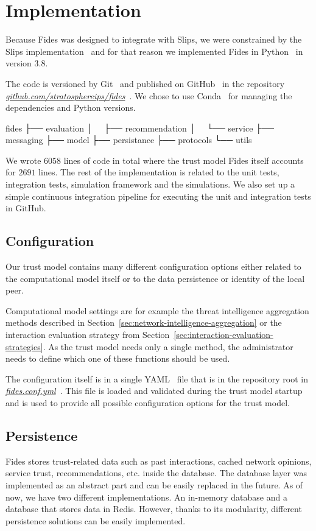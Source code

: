 \section{Implementation}
\label{sec:implementation}
Because Fides was designed to integrate with Slips, we were constrained by the Slips implementation~\cite{slips} and for that reason we implemented Fides in Python~\cite{python} in version 3.8.

The code is versioned by Git~\cite{git} and published on GitHub~\cite{github} in the repository \textit{\href{https://github.com/stratosphereips/fides}{github.com/stratosphereips/fides}}~\cite{fidesGithub}.
We chose to use Conda~\cite{conda} for managing the dependencies and Python versions.

fides
├── evaluation
│   ├── recommendation
│   └── service
├── messaging
├── model
├── persistance
├── protocols
└── utils

We wrote $6058$ lines of code in total where the trust model Fides itself accounts for $2691$ lines. The rest of the implementation is related to the unit tests, integration tests, simulation framework and the simulations.
We also set up a simple continuous integration pipeline for executing the unit and integration tests in GitHub.

\subsection{Configuration}
\label{subsec:configuration}
Our trust model contains many different configuration options either related to the computational model itself or to the data persistence or identity of the local peer.

Computational model settings are for example the threat intelligence aggregation methods described in Section~\ref{sec:network-intelligence-aggregation} or the interaction evaluation strategy from Section~\ref{sec:interaction-evaluation-strategies}.
As the trust model needs only a single method, the administrator needs to define which one of these functions should be used.

The configuration itself is in a single YAML~\cite{yaml} file that is in the repository root in \href{https://github.com/LukasForst/fides/blob/master/fides.conf.yml}{\textit{fides.conf.yml}}~\cite{fidesGithub}.
This file is loaded and validated during the trust model startup and is used to provide all possible configuration options for the trust model.

\subsection{Persistence}
\label{subsec:persistence}
Fides stores trust-related data such as past interactions, cached network opinions, service trust, recommendations, etc. inside the database.
The database layer was implemented as an abstract part and can be easily replaced in the future.
As of now, we have two different implementations. An in-memory database and a database that stores data in Redis.
However, thanks to its modularity, different persistence solutions can be easily implemented.

